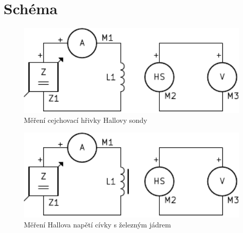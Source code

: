\section{Schéma}
  \begin{figure}[H]
    \centering
    \includegraphics[width=13cm]{../img/cejch.pdf}
    \caption{Měření cejchovací hřivky Hallovy sondy}
    \label{sch:1}
  \end{figure}
  
  \begin{figure}[H]
    \centering
    \includegraphics[width=13cm]{../img/mer.pdf}
    \caption{Měření Hallova napětí cívky s železným jádrem}
    \label{sch:2}
  \end{figure}

